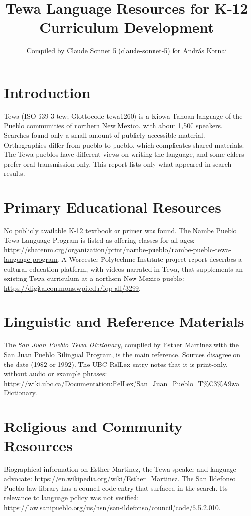 \documentclass[12pt]{article}
\title{Tewa Language Resources for K-12 Curriculum Development}
\author{Compiled by Claude Sonnet 5 (claude-sonnet-5) for Andr\'as Kornai}
\date{}
\begin{document}
\maketitle

\section{Introduction}
Tewa (ISO 639-3 tew; Glottocode tewa1260) is a Kiowa-Tanoan language of the Pueblo communities of northern New Mexico, with about 1,500 speakers. Searches found only a small amount of publicly accessible material. Orthographies differ from pueblo to pueblo, which complicates shared materials. The Tewa pueblos have different views on writing the language, and some elders prefer oral transmission only. This report lists only what appeared in search results.

\section{Primary Educational Resources}
No publicly available K-12 textbook or primer was found. The Nambe Pueblo Tewa Language Program is listed as offering classes for all ages: \url{https://sharenm.org/organization/print/nambe-pueblo/nambe-pueblo-tewa-language-program}.
A Worcester Polytechnic Institute project report describes a cultural-education platform, with videos narrated in Tewa, that supplements an existing Tewa curriculum at a northern New Mexico pueblo: \url{https://digitalcommons.wpi.edu/iqp-all/3299}.

\section{Linguistic and Reference Materials}
The \emph{San Juan Pueblo Tewa Dictionary}, compiled by Esther Martinez with the San Juan Pueblo Bilingual Program, is the main reference. Sources disagree on the date (1982 or 1992). The UBC RelLex entry notes that it is print-only, without audio or example phrases: \url{https://wiki.ubc.ca/Documentation:RelLex/San_Juan_Pueblo_T\%C3\%A9wa_Dictionary}.

\section{Religious and Community Resources}
Biographical information on Esther Martinez, the Tewa speaker and language advocate: \url{https://en.wikipedia.org/wiki/Esther_Martinez}.
The San Ildefonso Pueblo law library has a council code entry that surfaced in the search. Its relevance to language policy was not verified: \url{https://law.sanipueblo.org/us/nsn/san-ildefonso/council/code/6.5.2.010}.
\end{document}
